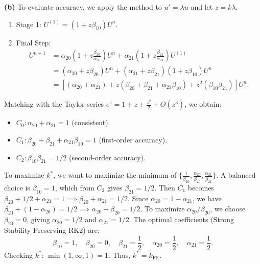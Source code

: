 \begin{solution}
\textbf{(b)} To evaluate accuracy, we apply the method to $u' = \lambda u$ and let $z = k\lambda$.
\begin{enumerate}
    \item Stage 1: $U^{(1)} = (1 + z\beta_{10}) U^n$.
    \item Final Step: 
    \begin{align*}
    U^{n+1} &= \alpha_{20}(1 + z\frac{\beta_{20}}{\alpha_{20}})U^n + \alpha_{21}(1 + z\frac{\beta_{21}}{\alpha_{21}})U^{(1)} \\
    &= (\alpha_{20} + z\beta_{20}) U^n + (\alpha_{21} + z\beta_{21})(1 + z\beta_{10}) U^n \\
    &= \left[ (\alpha_{20} + \alpha_{21}) + z(\beta_{20} + \beta_{21} + \alpha_{21}\beta_{10}) + z^2(\beta_{10}\beta_{21}) \right] U^n.
    \end{align*}
\end{enumerate}
Matching with the Taylor series $e^z = 1 + z + \frac{z^2}{2} + O(z^3)$, we obtain:
\begin{itemize}
    \item $C_0: \alpha_{20} + \alpha_{21} = 1$ (consistent).
    \item $C_1: \beta_{20} + \beta_{21} + \alpha_{21}\beta_{10} = 1$ (first-order accuracy).
    \item $C_2: \beta_{10}\beta_{21} = 1/2$ (second-order accuracy).
\end{itemize}
To maximize $k^*$, we want to maximize the minimum of $\{ \frac{1}{\beta_{10}}, \frac{\alpha_{20}}{\beta_{20}}, \frac{\alpha_{21}}{\beta_{21}} \}$. A balanced choice is $\beta_{10} = 1$, which from $C_2$ gives $\beta_{21} = 1/2$.
Then $C_1$ becomes $\beta_{20} + 1/2 + \alpha_{21} = 1 \implies \beta_{20} + \alpha_{21} = 1/2$.
Since $\alpha_{20} = 1 - \alpha_{21}$, we have $\beta_{20} + (1 - \alpha_{20}) = 1/2 \implies \alpha_{20} - \beta_{20} = 1/2$.
To maximize $\alpha_{20}/\beta_{20}$, we choose $\beta_{20} = 0$, giving $\alpha_{20} = 1/2$ and $\alpha_{21} = 1/2$.
The optimal coefficients (Strong Stability Preserving RK2) are:
\[ \beta_{10} = 1, \quad \beta_{20} = 0, \quad \beta_{21} = \frac{1}{2}, \quad \alpha_{20} = \frac{1}{2}, \quad \alpha_{21} = \frac{1}{2}. \]
Checking $k^*$: $\min(1, \infty, 1) = 1$. Thus, $k^* = k_{\mathrm{FE}}$.
\end{solution}

